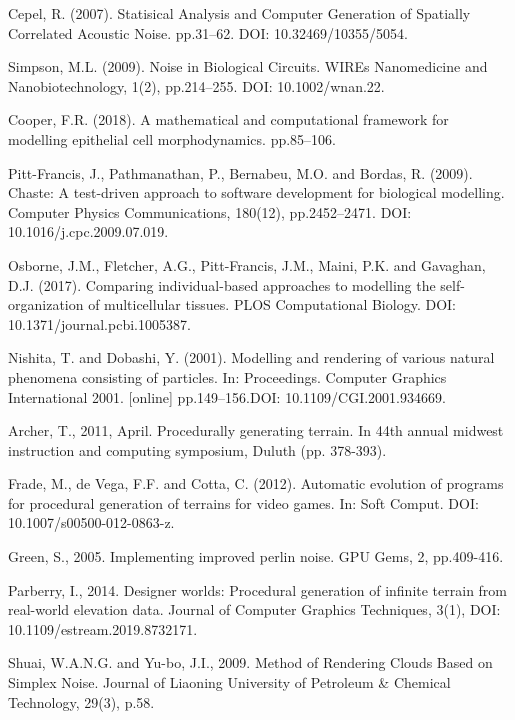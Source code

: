 \documentclass[11pt,a4paper]{article}
\begin{document}
\begin{thebibliography}{9}

Cepel, R. (2007). Statisical Analysis and Computer Generation of Spatially Correlated Acoustic Noise. pp.31–62. DOI: 10.32469/10355/5054.

Simpson, M.L. (2009). Noise in Biological Circuits. WIREs Nanomedicine and Nanobiotechnology, 1(2), pp.214–255. DOI: 10.1002/wnan.22.

Cooper, F.R. (2018). A mathematical and computational framework for modelling epithelial cell morphodynamics. pp.85–106.

Pitt-Francis, J., Pathmanathan, P., Bernabeu, M.O. and Bordas, R. (2009). Chaste: A test-driven approach to software development for biological modelling. Computer Physics Communications, 180(12), pp.2452–2471. DOI: 10.1016/j.cpc.2009.07.019.

Osborne, J.M., Fletcher, A.G., Pitt-Francis, J.M., Maini, P.K. and Gavaghan, D.J. (2017). Comparing individual-based approaches to modelling the self-organization of multicellular tissues. PLOS Computational Biology. DOI: 10.1371/journal.pcbi.1005387.

Nishita, T. and Dobashi, Y. (2001). Modelling and rendering of various natural phenomena consisting of particles. In: Proceedings. Computer Graphics International 2001. [online] pp.149–156.DOI: 10.1109/CGI.2001.934669.

Archer, T., 2011, April. Procedurally generating terrain. In 44th annual midwest instruction and computing symposium, Duluth (pp. 378-393).

Frade, M., de Vega, F.F. and Cotta, C. (2012). Automatic evolution of programs for procedural generation of terrains for video games. In: Soft Comput. DOI: 10.1007/s00500-012-0863-z.

Green, S., 2005. Implementing improved perlin noise. GPU Gems, 2, pp.409-416.

Parberry, I., 2014. Designer worlds: Procedural generation of infinite terrain from real-world elevation data. Journal of Computer Graphics Techniques, 3(1), DOI: 10.1109/estream.2019.8732171.

Shuai, W.A.N.G. and Yu-bo, J.I., 2009. Method of Rendering Clouds Based on Simplex Noise. Journal of Liaoning University of Petroleum \& Chemical Technology, 29(3), p.58.


\end{thebibliography}
\end{document}
